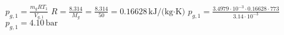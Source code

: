 \( p_{g,1} = \frac{m_g R T_1}{V_{g,1}} \)  
\( R = \frac{8.314}{M_g} = \frac{8.314}{50} = 0.16628 \, \text{kJ/(kg·K)} \)  
\( p_{g,1} = \frac{3.4979 \cdot 10^{-3} \cdot 0.16628 \cdot 773}{3.14 \cdot 10^{-3}} \)  
\( p_{g,1} = 4.10 \, \text{bar} \)